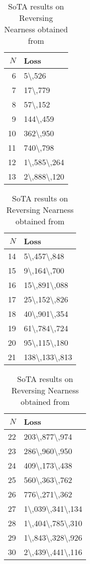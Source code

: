 \begingroup
\renewcommand{\arraystretch}{0.7}
\begin{table}[htpb]
\begin{center}
\begin{tabular}{r|l}
  $N$ & Loss\\\hline
  6&\num{5\,526}\\
  7&\num{17\,779}\\
  8&\num{57\,152}\\
  9&\num{144\,459}\\
  10&\num{362\,950}\\
  11&\num{740\,798}\\
  12&\num{1\,585\,264}\\
  13&\num{2\,888\,120}\\
\end{tabular}
\begin{tabular}{r|l}
  $N$ & Loss\\\hline
  14&\num{5\,457\,848}\\
  15&\num{9\,164\,700}\\
  16&\num{15\,891\,088}\\
  17&\num{25\,152\,826}\\
  18&\num{40\,901\,354}\\
  19&\num{61\,784\,724}\\
  20&\num{95\,115\,180}\\
  21&\num{138\,133\,813}\\
\end{tabular}
\begin{tabular}{r|l}
  $N$ & Loss\\\hline
  22&\num{203\,877\,974}\\
  23&\num{286\,960\,950}\\
  24&\num{409\,173\,438}\\
  25&\num{560\,363\,762}\\
  26&\num{776\,271\,362}\\
  27&\num{1\,039\,341\,134}\\
  28&\num{1\,404\,785\,310}\\
  29&\num{1\,843\,328\,926}\\
  30&\num{2\,439\,441\,116}
\end{tabular}
\end{center}
\caption{SoTA results on Reversing Nearness obtained from \cite{zimmermann}}
    \label{tab:sota}
\end{table}
\endgroup

